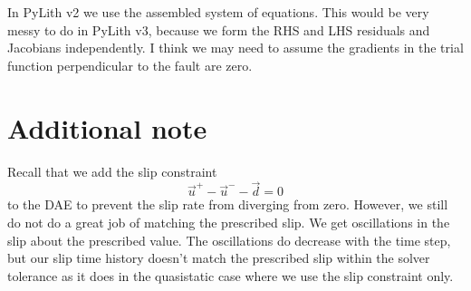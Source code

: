 \documentclass{article}
\begin{document}
In PyLith v2 we use the assembled system of equations.
This would be very messy to do in PyLith v3, because we form the RHS and LHS residuals and Jacobians independently.
I think we may need to assume the gradients in the trial function perpendicular to the fault are zero.

\section{Additional note}
Recall that we add the slip constraint
\begin{equation}
  \vec{u}^+ - \vec{u}^- - \vec{d} = 0
\end{equation}
to the DAE to prevent the slip rate from diverging from zero.
However, we still do not do a great job of matching the prescribed slip.
We get oscillations in the slip about the prescribed value.
The oscillations do decrease with the time step, but our slip time history doesn't match the prescribed slip within the solver tolerance as it does in the quasistatic case where we use the slip constraint only.
\end{document}
